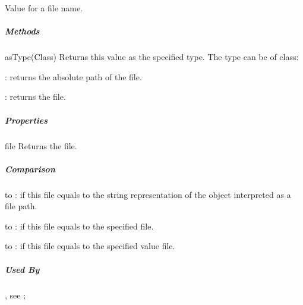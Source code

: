 \label{par:filevalue}

Value for a file name.

\subparagraph{Methods}

\begin{asparadesc}
%
\item[asType(Class)] Returns this value as the specified type.
The type can be of class:
\begin{compactitem}
\item {}: returns the absolute path of the file.
\item {}: returns the file.
\end{compactitem}
%
\end{asparadesc}

\subparagraph{Properties}

\begin{asparadesc}
%
\item[file] Returns the file.
%
\end{asparadesc}

\subparagraph{Comparison}

\begin{compactitem}
%
\item to : if this file equals to the string representation of the
object interpreted as a file path.
%
\item to : if this file equals to the specified file.
%
\item to : if this file equals to the specified value file.
%
\end{compactitem}

\subparagraph{Used By}

\begin{compactitem}
%
\item {}, see ;
%
\end{compactitem}




